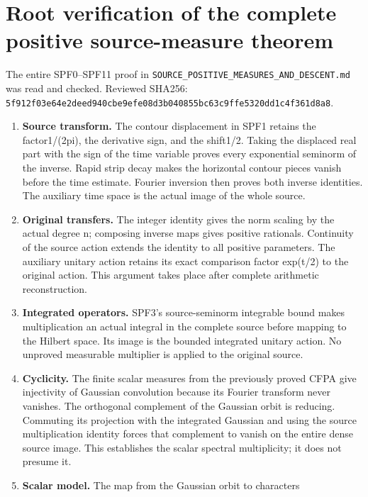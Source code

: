 \section{Root verification of the complete positive source-measure
theorem}\label{root-verification-of-the-complete-positive-source-measure-theorem}

The entire SPF0--SPF11 proof in
\nolinkurl{SOURCE_POSITIVE_MEASURES_AND_DESCENT.md} was read and
checked. Reviewed SHA256:
\nolinkurl{5f912f03e64e2deed940cbe9efe08d3b040855bc63c9ffe5320dd1c4f361d8a8}.

\begin{enumerate}
\def\labelenumi{\arabic{enumi}.}
\item
  \textbf{Source transform.} The contour displacement in SPF1 retains
  the factor1/(2pi), the derivative sign, and the shift1/2. Taking the
  displaced real part with the sign of the time variable proves every
  exponential seminorm of the inverse. Rapid strip decay makes the
  horizontal contour pieces vanish before the time estimate. Fourier
  inversion then proves both inverse identities. The auxiliary time
  space is the actual image of the whole source.
\item
  \textbf{Original transfers.} The integer identity gives the norm
  scaling by the actual degree n; composing inverse maps gives positive
  rationals. Continuity of the source action extends the identity to all
  positive parameters. The auxiliary unitary action retains its exact
  comparison factor exp(t/2) to the original action. This argument takes
  place after complete arithmetic reconstruction.
\item
  \textbf{Integrated operators.} SPF3's source-seminorm integrable bound
  makes multiplication an actual integral in the complete source before
  mapping to the Hilbert space. Its image is the bounded integrated
  unitary action. No unproved measurable multiplier is applied to the
  original source.
\item
  \textbf{Cyclicity.} The finite scalar measures from the previously
  proved CFPA give injectivity of Gaussian convolution because its
  Fourier transform never vanishes. The orthogonal complement of the
  Gaussian orbit is reducing. Commuting its projection with the
  integrated Gaussian and using the source multiplication identity
  forces that complement to vanish on the entire dense source image.
  This establishes the scalar spectral multiplicity; it does not presume
  it.
\item
  \textbf{Scalar model.} The map from the Gaussian orbit to characters

\end{enumerate}
